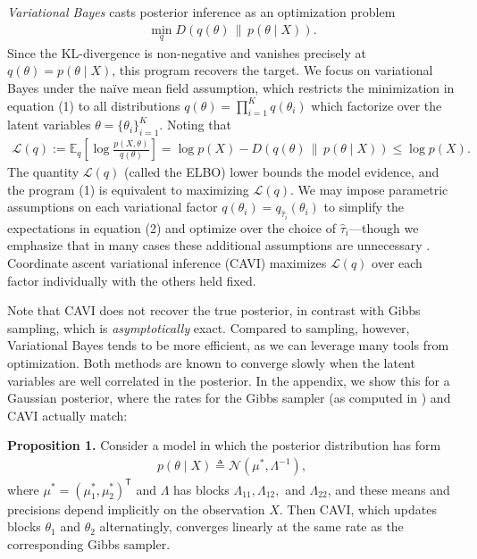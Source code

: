 \documentclass{article}
\begin{document}
{\sl Variational Bayes} casts posterior inference as an optimization problem
\begin{align}
\min_{q}D(q(\theta)\,\|\, p(\theta\mid X)).
\end{align}
Since the KL-divergence is non-negative and vanishes precisely at $q(\theta) = p(\theta\mid X)$, this program recovers the target. We focus on variational Bayes under the na\"ive mean field assumption, which restricts the minimization in equation (1) to all distributions $q(\theta) = \prod_{i=1}^Kq(\theta_i)$ which factorize over the latent variables $\theta = \{\theta_i\}_{i=1}^K$. Noting that
\begin{align}
\mathcal L(q) :=  \mathbb E_q\left[\log\frac{p(X,\theta)}{q(\theta)}\right] =\log p(X) -  D(q(\theta)\,\|\, p(\theta\mid X)) \le \log p(X).
\end{align}
The quantity $\mathcal L(q)$ (called the ELBO) lower bounds the model evidence, and the program (1) is equivalent to maximizing $\mathcal L(q)$. We may impose parametric assumptions on each variational factor $q(\theta_i) = q_{\widehat\tau_i}(\theta_i)$ to simplify the expectations in equation (2) and optimize over the choice of $\widehat\tau_i$---though we emphasize that in many cases these additional assumptions are unnecessary \cite{Beal,Blei}. Coordinate ascent variational inference (CAVI) maximizes $\mathcal L(q)$ over each factor individually with the others held fixed. 

Note that CAVI does not recover the true posterior, in contrast with Gibbs sampling, which is {\sl asymptotically} exact. Compared to sampling, however, Variational Bayes tends to be more efficient, as we can leverage many tools from optimization. Both methods are known to converge slowly when the latent variables are well correlated in the posterior. In the appendix, we show this for a Gaussian posterior, where the rates for the Gibbs sampler (as computed in \cite{Sahu}) and CAVI actually match:

{\bf Proposition 1.} Consider a model in which the posterior distribution has form
\begin{align}
p(\theta\mid X) \triangleq \mathcal N(\mu^*,\Lambda^{-1}),
\end{align}
where $\mu^* = (\mu_1^*,\mu_2^*)^{\mathsf T}$ and $\Lambda$ has blocks $\Lambda_{11}, \Lambda_{12},$ and $\Lambda_{22}$, and these means and precisions depend implicitly on the observation $X$. Then CAVI, which updates blocks $\theta_1$ and $\theta_2$ alternatingly, converges linearly at the same rate as the corresponding Gibbs sampler.
\end{document}
